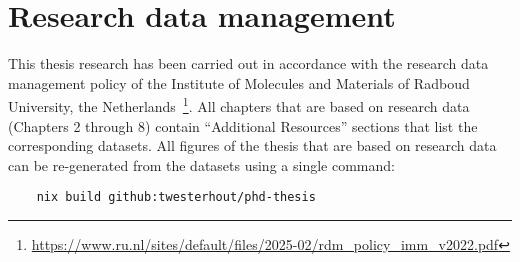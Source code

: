 \chapter{Research data management}

This thesis research has been carried out in accordance with the research data management policy of the Institute of Molecules and Materials of Radboud University, the Netherlands~\footnote{\url{https://www.ru.nl/sites/default/files/2025-02/rdm_policy_imm_v2022.pdf}}.
All chapters that are based on research data (Chapters 2 through 8) contain ``Additional Resources'' sections that list the corresponding datasets. All figures of the thesis that are based on research data can be re-generated from the datasets using a single command:
\begin{verbatim}
    nix build github:twesterhout/phd-thesis
\end{verbatim}
